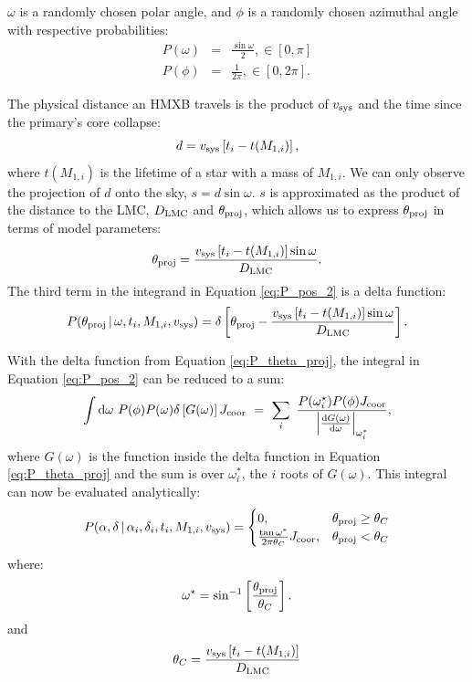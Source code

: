 \documentclass[12pt, preprint]{aastex}
\newcommand{\given}{\,|\,}
\newcommand{\dd}{\mathrm{d}}
\begin{document}
$\omega$ is a randomly chosen polar angle, and $\phi$ is a randomly chosen azimuthal angle with respective probabilities: 
\begin{eqnarray}
P(\omega) &=& \frac{\sin \omega} {2}, \in [0,\pi] \\
P(\phi) &=& \frac{1}{2 \pi}, \in [0, 2\pi].
\end{eqnarray}


The physical distance an HMXB travels is the product of $v_{\rm sys}$ and the time since the primary's core collapse:
\begin{equation}
d = v_{\rm sys} \left[t_i - t(M_{1,i}) \right],
\end{equation}
where $t(M_{1,i})$ is the lifetime of a star with a mass of $M_{1,i}$. We can only observe the projection of $d$ onto the sky, $s = d \sin \omega$. $s$ is approximated as the product of the distance to the LMC, $D_{\rm LMC}$ and $\theta_{\rm proj}$, which allows us to express $\theta_{\rm proj}$ in terms of model parameters:
\begin{equation}
\theta_{\rm proj} = \frac{v_{\rm sys} \left[ t_i - t(M_{1,i}) \right] \sin \omega}{D_{\rm LMC}}. \label{eq:theta_proj}
\end{equation}
The third term in the integrand in Equation \ref{eq:P_pos_2} is a delta function:
\begin{equation}
P(\theta_{\rm proj} \given \omega, t_i, M_{1,i}, v_{\rm sys}) = \delta \left[ \theta_{\rm proj} - \frac{v_{\rm sys} \left[t_i - t(M_{1,i}) \right] \sin \omega}{D_{\rm LMC}} \right]. \label{eq:P_theta_proj}
\end{equation}


With the delta function from Equation \ref{eq:P_theta_proj}, the integral in Equation \ref{eq:P_pos_2} can be reduced to a sum:
\begin{equation}
\int \dd \omega\ P(\phi) P(\omega) \delta \left[ G(\omega) \right]  J_{\rm coor}\  =\ \sum_i\ \frac{P(\omega_i^{\star}) P(\phi)  J_{\rm coor}}{ \left| \frac{ \dd G (\omega) }{\dd \omega} \right|_{\omega_i^*}},
\end{equation}
where $G(\omega)$ is the function inside the delta function in Equation \ref{eq:P_theta_proj} and the sum is over $\omega_i^*$, the $i$ roots of $G(\omega)$. This integral can now be evaluated analytically:
\begin{equation}
P(\alpha, \delta \given \alpha_i, \delta_i, t_i, M_{1,i}, v_{\rm sys} ) =
\begin{cases} 
      0, & \theta_{\rm proj} \geq \theta_C\\
     \frac{\tan \omega^*}{2 \pi \theta_C}  J_{\rm coor}, & \theta_{\rm proj} < \theta_C 
   \end{cases}
\end{equation}
where:
\begin{equation}
\omega^{\star} = \sin^{-1} \left[ \frac{\theta_{\rm proj}}{\theta_C} \right].
\end{equation}
and
\begin{equation}
\theta_C = \frac{v_{\rm sys} \left[ t_i - t(M_{1,i}) \right]}{D_{\rm LMC}} \label{eq:theta_c}
\end{equation}
\end{document}
